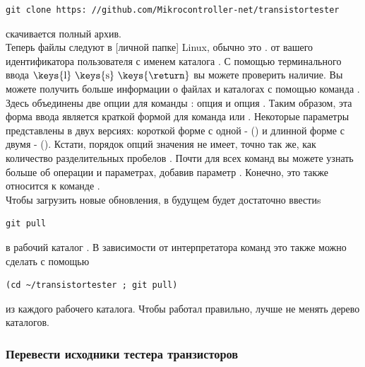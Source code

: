 \begin{large} \vspace{-0.4em} \begin{verbatim}
git clone https: //github.com/Mikrocontroller-net/transistortester
\end{verbatim} \end{large}
скачивается полный архив. \\
Теперь файлы следуют в [личной папке] Linux, обычно это .
от вашего идентификатора пользователя с именем каталога .
С помощью терминального ввода  \(\mbox{\keys{l} \keys{s} \keys{\return}} \) вы можете
проверить наличие.
Вы можете получить больше информации о файлах и каталогах с помощью
команда . 
Здесь объединены две опции для команды : опция  и опция .
Таким образом, эта форма ввода является краткой формой для
команда  или .
Некоторые параметры представлены в двух версиях: короткой форме с одной - () и длинной
форме с двумя - ().
Кстати, порядок опций значения не имеет,
точно так же, как количество разделительных пробелов \keys{\space}.
Почти для всех команд вы можете узнать больше об операции и параметрах, добавив параметр .
Конечно, это также относится к команде . \\
Чтобы загрузить новые обновления, в будущем будет достаточно ввестиs
\begin{large} \vspace{-0.4em} \begin{verbatim}
git pull
\end{verbatim} \end{large}
в рабочий каталог . 
В зависимости от интерпретатора команд это также можно сделать с помощью
\begin{large} \vspace{-0.4em} \begin{verbatim}
(cd ~/transistortester ; git pull)
\end{verbatim} \end{large}
из каждого рабочего каталога.
Чтобы  работал правильно, лучше не менять дерево каталогов.

\subsubsection{Перевести исходники тестера транзисторов}

